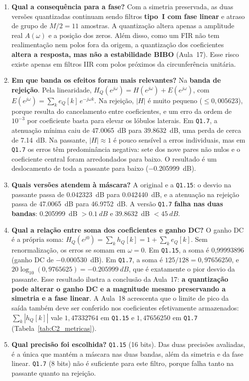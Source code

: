 \documentclass[11pt,a4paper]{article}
\newcommand{\MetricaCSomaQXV}{0{,}99993896}
\newcommand{\MetricaCSomaAbsQXV}{1{,}47332764}
\newcommand{\MetricaCSomaAbsQVII}{1{,}47656250}
\begin{document}
\begin{enumerate}[leftmargin=1.6em, itemsep=3pt]
    \item \textbf{Qual a consequência para a fase?}
    Com a simetria preservada, as duas versões quantizadas continuam sendo filtros \textbf{tipo~I com fase linear} e atraso de grupo de $M/2 = 11$ amostras. A quantização altera apenas a amplitude real $A(\omega)$ e a posição dos zeros. Além disso, como um FIR não tem realimentação nem polos fora da origem, a quantização dos coeficientes \textbf{altera a resposta, mas não a estabilidade BIBO} (Aula~17). Esse risco existe apenas em filtros IIR com polos próximos da circunferência unitária.

    \item \textbf{Em que banda os efeitos foram mais relevantes?}
    Na \textbf{banda de rejeição}. Pela linearidade, $H_Q(e^{j\omega}) = H(e^{j\omega}) + E(e^{j\omega})$, com $E(e^{j\omega}) = \sum_k e_Q[k]\,e^{-j\omega k}$. Na rejeição, $|H|$ é muito pequeno ($\le 0,005623$), porque resulta do cancelamento entre coeficientes, e um erro da ordem de $10^{-3}$ por coeficiente basta para elevar os lóbulos laterais. Em \texttt{Q1.7}, a atenuação mínima caiu de \SI{47,0065}{dB} para \SI{39,8632}{dB}, uma perda de cerca de \SI{7,14}{dB}. Na passante, $|H| \approx 1$ é pouco sensível a erros individuais, mas em \texttt{Q1.7} os erros têm predominância negativa: sete dos nove pares não nulos e o coeficiente central foram arredondados para baixo. O resultado é um deslocamento de toda a passante para baixo (\SI{-0,205999}{dB}).

    \item \textbf{Quais versões atendem à máscara?}
    A original e a \texttt{Q1.15}: o desvio na passante passa de \SI{0,042323}{dB} para \SI{0,042440}{dB}, e a atenuação na rejeição passa de \SI{47,0065}{dB} para \SI{46,9752}{dB}. A versão \texttt{Q1.7} \textbf{falha nas duas bandas}: \SI{0,205999}{dB} $> \SI{0,1}{dB}$ e \SI{39,8632}{dB} $< \SI{45}{dB}$.

    \item \textbf{Qual a relação entre soma dos coeficientes e ganho DC?}
    O ganho DC é a própria soma: $H_Q(e^{j0}) = \sum_k h_Q[k] = 1 + \sum_k e_Q[k]$. Sem renormalização, os erros se somam em $\omega = 0$. Em \texttt{Q1.15}, a soma é \MetricaCSomaQXV{} (ganho DC de \SI{-0,000530}{dB}). Em \texttt{Q1.7}, a soma é $125/128 = 0,97656250$, e $20\log_{10}(0,9765625) = \SI{-0,205999}{dB}$, que é exatamente o pior desvio da passante. Esse resultado ilustra a conclusão da Aula~17: \textbf{a quantização pode alterar o ganho DC e a magnitude mesmo preservando a simetria e a fase linear}. A Aula~18 acrescenta que o limite de pico da saída também deve ser conferido nos coeficientes efetivamente armazenados: $\sum_k |h_Q[k]|$ vale $\MetricaCSomaAbsQXV$ em \texttt{Q1.15} e $\MetricaCSomaAbsQVII$ em \texttt{Q1.7} (Tabela~\ref{tab:C2_metricas}).

    \item \textbf{Qual precisão foi escolhida?}
    \texttt{Q1.15} (16 bits). Das duas precisões avaliadas, é a única que mantém a máscara nas duas bandas, além da simetria e da fase linear. \texttt{Q1.7} (8 bits) não é suficiente para este filtro, porque falha tanto na passante quanto na rejeição.
\end{enumerate}
\end{document}

